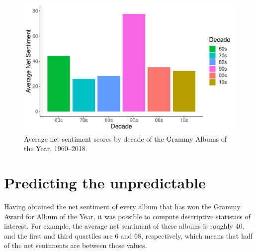 \documentclass{article}
\begin{document}
\begin{figure}[h]
    \centering
    \includegraphics[scale=0.5]{Plots/graph_decade_mean_sentiment.pdf}
    \caption{Average net sentiment scores by decade of the Grammy Albums of the Year, 1960--2018.}
    \label{fig:decade_sentiment}
\end{figure}


\FloatBarrier






\section*{Predicting the unpredictable}


Having obtained the net sentiment of every album that has won the Grammy Award for Album of the Year, it was possible to compute descriptive statistics of interest. For example, the average net sentiment of these albums is roughly 40, and the first and third quartiles are 6 and 68, respectively, which means that half of the net sentiments are between these values. \\
\end{document}
